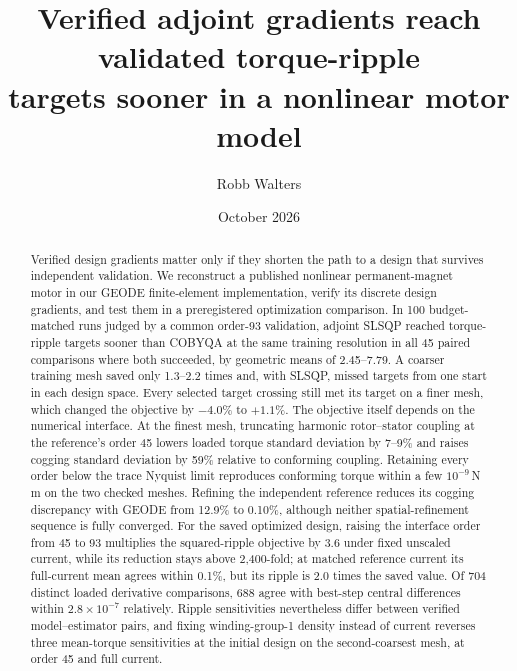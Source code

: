 \documentclass{anvil-paper}
\title{Verified adjoint gradients reach validated torque-ripple\\
targets sooner in a nonlinear motor model}
\author{Robb Walters}
\date{October 2026}
\begin{document}
\maketitle
\begin{abstract}
Verified design gradients matter only if they shorten the path to a design
that survives independent validation. We reconstruct a published nonlinear
permanent-magnet motor in our GEODE finite-element implementation, verify
its discrete design gradients, and test them in a preregistered optimization
comparison. In 100 budget-matched runs judged by a common order-93
validation, adjoint SLSQP reached torque-ripple targets sooner than COBYQA at
the same training resolution in all 45 paired comparisons where both
succeeded, by geometric means of 2.45--7.79. A coarser training mesh saved
only 1.3--2.2 times and, with SLSQP, missed targets from one start in each
design space. Every selected target crossing still met its target on a
finer mesh, which changed the objective by $-4.0\%$ to $+1.1\%$.
The objective itself depends on the numerical interface. At the finest
mesh, truncating harmonic rotor--stator coupling at the reference's order 45
lowers loaded torque standard deviation by 7--9\% and raises cogging
standard deviation by 59\% relative to conforming coupling. Retaining every
order below the trace Nyquist limit reproduces conforming torque within a
few $10^{-9}$\,N\,m on the two checked meshes. Refining the independent reference reduces its cogging
discrepancy with GEODE from 12.9\% to 0.10\%, although neither
spatial-refinement sequence is fully converged. For the saved optimized
design, raising the interface order from 45 to 93 multiplies the
squared-ripple objective by 3.6 under fixed unscaled current, while its
reduction stays above
2,400-fold; at matched reference current its full-current mean agrees
within 0.1\%, but its ripple is 2.0 times the saved value. Of 704 distinct
loaded derivative comparisons, 688 agree with best-step central
differences within $2.8\times10^{-7}$ relatively. Ripple sensitivities
nevertheless differ between verified model--estimator pairs, and fixing
winding-group-1 density instead of current reverses three mean-torque
sensitivities at the initial design on the second-coarsest mesh, at order
45 and full current.
\end{abstract}
\end{document}
